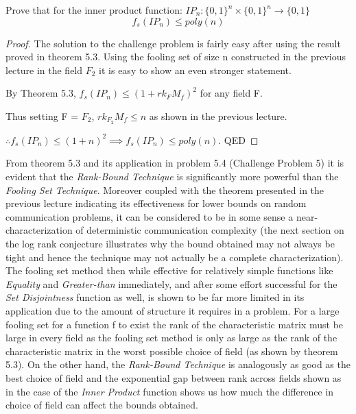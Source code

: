 \documentclass[usletter]{article}
\begin{document}
\begin {problem}
Prove that for the inner product function: $IP_n: \{0, 1\}^n \times \{0, 1\}^n \rightarrow \{0, 1\}$
$$f_s(IP_n) \leq poly(n)$$
\end{problem}

\begin{proof}
\noindent The solution to the challenge problem is fairly easy after using the result proved in theorem 5.3. Using the fooling set of size n constructed in the previous lecture in the field $F_2$ it is easy to show an even stronger statement. \newline

\noindent By Theorem 5.3, $f_s(IP_n) \leq  {(1 + rk_F M_f)}^2$ for any field F. \newline

\noindent Thus setting F = $F_2$, $rk_{F_2} M_f \leq n$ as shown in the previous lecture. \newline

\noindent $\therefore f_s(IP_n) \leq {(1 +n)}^2 \implies f_s(IP_n) \leq poly(n)$. QED

\end{proof}

\noindent From theorem 5.3 and its application in problem 5.4 (Challenge Problem 5) it is evident that the \emph{Rank-Bound Technique} is significantly more powerful than the \emph {Fooling Set Technique}. Moreover coupled with the theorem presented in the previous lecture indicating its effectiveness for lower bounds on random communication problems, it can be considered to be in some sense a near-characterization of deterministic communication complexity (the next section on the log rank conjecture illustrates why the bound obtained may not always be tight and hence the technique may not actually be a complete characterization). The fooling set method then while effective for relatively simple functions like \emph{Equality} and \emph {Greater-than} immediately, and after some effort successful for the \emph {Set Disjointness} function as well, is shown to be far more limited in its application due to the amount of structure it requires in a problem. For a large fooling set for a function f to exist the rank of the characteristic matrix must be large in every field as the fooling set method is only as large as the rank of the characteristic matrix in the worst possible choice of field (as shown by theorem 5.3). On the other hand, the \emph {Rank-Bound Technique} is analogously as good as the best choice of field and the exponential gap between rank across fields shown as in the case of the \emph {Inner Product} function shows us how much the difference in choice of field can affect the bounds obtained. 
\end{document}
